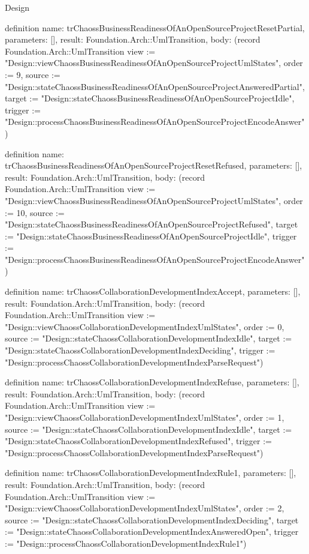 \begin{lexlean}{Design}
\begin{semanticmodule}
definition{
  name: trChaossBusinessReadinessOfAnOpenSourceProjectResetPartial,
  parameters: [],
  result: Foundation.Arch::UmlTransition,
  body: (record Foundation.Arch::UmlTransition {view := "Design::viewChaossBusinessReadinessOfAnOpenSourceProjectUmlStates", order := 9, source := "Design::stateChaossBusinessReadinessOfAnOpenSourceProjectAnsweredPartial", target := "Design::stateChaossBusinessReadinessOfAnOpenSourceProjectIdle", trigger := "Design::processChaossBusinessReadinessOfAnOpenSourceProjectEncodeAnswer"})
}

definition{
  name: trChaossBusinessReadinessOfAnOpenSourceProjectResetRefused,
  parameters: [],
  result: Foundation.Arch::UmlTransition,
  body: (record Foundation.Arch::UmlTransition {view := "Design::viewChaossBusinessReadinessOfAnOpenSourceProjectUmlStates", order := 10, source := "Design::stateChaossBusinessReadinessOfAnOpenSourceProjectRefused", target := "Design::stateChaossBusinessReadinessOfAnOpenSourceProjectIdle", trigger := "Design::processChaossBusinessReadinessOfAnOpenSourceProjectEncodeAnswer"})
}

definition{
  name: trChaossCollaborationDevelopmentIndexAccept,
  parameters: [],
  result: Foundation.Arch::UmlTransition,
  body: (record Foundation.Arch::UmlTransition {view := "Design::viewChaossCollaborationDevelopmentIndexUmlStates", order := 0, source := "Design::stateChaossCollaborationDevelopmentIndexIdle", target := "Design::stateChaossCollaborationDevelopmentIndexDeciding", trigger := "Design::processChaossCollaborationDevelopmentIndexParseRequest"})
}

definition{
  name: trChaossCollaborationDevelopmentIndexRefuse,
  parameters: [],
  result: Foundation.Arch::UmlTransition,
  body: (record Foundation.Arch::UmlTransition {view := "Design::viewChaossCollaborationDevelopmentIndexUmlStates", order := 1, source := "Design::stateChaossCollaborationDevelopmentIndexIdle", target := "Design::stateChaossCollaborationDevelopmentIndexRefused", trigger := "Design::processChaossCollaborationDevelopmentIndexParseRequest"})
}

definition{
  name: trChaossCollaborationDevelopmentIndexRule1,
  parameters: [],
  result: Foundation.Arch::UmlTransition,
  body: (record Foundation.Arch::UmlTransition {view := "Design::viewChaossCollaborationDevelopmentIndexUmlStates", order := 2, source := "Design::stateChaossCollaborationDevelopmentIndexDeciding", target := "Design::stateChaossCollaborationDevelopmentIndexAnsweredOpen", trigger := "Design::processChaossCollaborationDevelopmentIndexRule1"})
}


\end{semanticmodule}
\end{lexlean}
